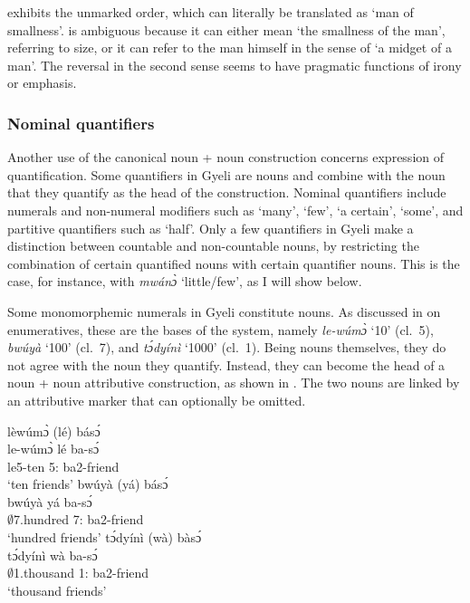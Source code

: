  exhibits the unmarked order, which can literally be translated as `man of smallness'.  is ambiguous because it can  either mean `the smallness of the man', referring to size, or it can refer to the man himself in the sense of `a midget of a man'.
The reversal in the second sense seems  to have pragmatic functions of irony or emphasis. 


\subsubsection{Nominal quantifiers}  
\label{sec:NomQUANT}

Another use of the canonical noun + noun construction concerns expression of quantification. Some quantifiers in Gyeli are nouns and combine with the noun that they quantify as the head of the construction.
Nominal quantifiers include numerals and non-numeral modifiers such as `many', `few', `a certain', `some', and partitive quantifiers such as `half'. Only a few quantifiers in Gyeli make a distinction between countable and non-countable nouns, by restricting the combination of certain quantified nouns with certain quantifier nouns. This is the case, for instance, with {\itshape mwánɔ̀} `little/few', as I will show below.

 Some monomorphemic numerals in Gyeli constitute nouns. As discussed in  on enumeratives, these are the bases of the system, namely {\itshape le-wúmɔ̀} `10' (cl.~5), {\itshape bwúyà} `100' (cl.~7), and {\itshape tɔ́dyínì} `1000' (cl.~1). Being nouns themselves, they do not agree with the noun they quantify. Instead, they can become the head of a noun + noun attributive construction, as shown in . The two nouns are linked by an attributive marker that can optionally be omitted.

\ea\label{NumNoun}
\ea \label{NumNoun1}
  \glll     lèwúmɔ̀ (lé) básɔ́\\
  le-wúmɔ̀ lé ba-sɔ́\\
                le5-ten 5:{\ATT} ba2-friend \\
    \trans `ten friends'
\ex\label{NumNoun2}
 \glll     bwúyà (yá) básɔ́ \\
 bwúyà yá ba-sɔ́ \\
                $\emptyset$7.hundred 7:{\ATT} ba2-friend \\
    \trans `hundred friends'
\ex\label{NumNoun3}
 \glll     tɔ́dyínì (wà) bàsɔ́ \\
 tɔ́dyínì wà ba-sɔ́ \\
                $\emptyset$1.thousand 1:{\ATT} ba2-friend \\
    \trans `thousand friends'
\z
\z

